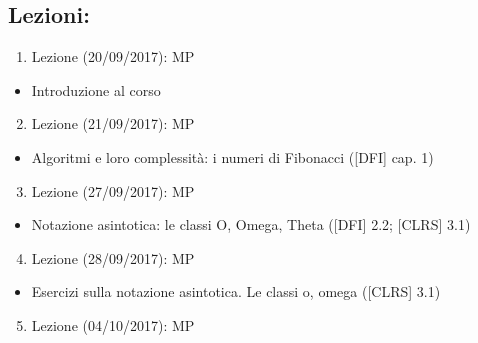 \documentclass{article}
\providecommand{\tightlist}{%
  \setlength{\itemsep}{0pt}\setlength{\parskip}{0pt}}
\begin{document}
\hypertarget{h.56skrlxpqr7c}{\subsection{\texorpdfstring{{Lezioni:}}{Lezioni:}}\label{h.56skrlxpqr7c}}

\begin{enumerate}
\tightlist
\item
  {Lezione (20/09/2017): MP}
\end{enumerate}

\begin{itemize}
\tightlist
\item
  {Introduzione al corso}
\end{itemize}

\begin{enumerate}
\setcounter{enumi}{1}
\tightlist
\item
  {Lezione (21/09/2017): MP}
\end{enumerate}

\begin{itemize}
\tightlist
\item
  {Algoritmi e loro complessità: i numeri di Fibonacci ({[}DFI{]} cap.
  1)}
\end{itemize}

\begin{enumerate}
\setcounter{enumi}{2}
\tightlist
\item
  {Lezione (27/09/2017): MP}
\end{enumerate}

\begin{itemize}
\tightlist
\item
  {Notazione asintotica: le classi O, Omega, Theta ({[}DFI{]} 2.2;
  {[}CLRS{]} 3.1)}
\end{itemize}

\begin{enumerate}
\setcounter{enumi}{3}
\tightlist
\item
  {Lezione (28/09/2017): MP}
\end{enumerate}

\begin{itemize}
\tightlist
\item
  {Esercizi sulla notazione asintotica. Le classi o, omega ({[}CLRS{]}
  3.1)}
\end{itemize}

\begin{enumerate}
\setcounter{enumi}{4}
\tightlist
\item
  {Lezione (04/10/2017): MP}
\end{enumerate}
\end{document}
